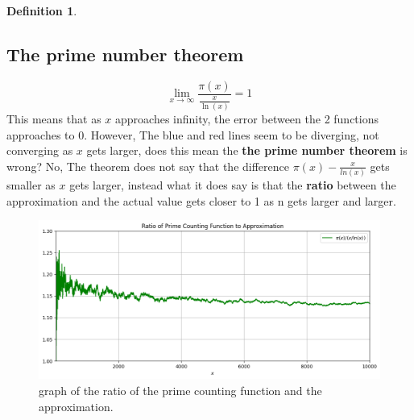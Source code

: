 \documentclass[12pt]{amsart} %
\theoremstyle{definition}
\newtheorem{definition}[thm]{Definition}
\theoremstyle{remark}
\numberwithin{equation}{section}
\begin{document}
\begin{definition}
\subsection{The prime number theorem}
$$\lim_{x\rightarrow\infty}\frac{\pi(x)}{\frac{x}{\ln(x)}} = 1$$
This means that as $x$ approaches infinity, the error between the 2 functions approaches to 0. However, The blue and red lines seem to be diverging, not converging as $x$ gets larger, does this mean the \textbf{the prime number theorem} is wrong? No, The theorem does not say that the difference $\pi(x) - \frac{x}{ln(x)}$ gets smaller as $x$ gets larger, instead what it does say is that the \textbf{ratio} between the approximation and the actual value gets closer to 1 as n gets larger and larger.



\begin{figure}[h!]
    \centering
    \includegraphics[width=0.8\linewidth]{../Images/ratio}
    \caption{graph of the ratio of the prime counting function and the approximation. }
    \label{fig:euler_zeta}
\end{figure}

\end{definition}
\newpage
\end{document}

